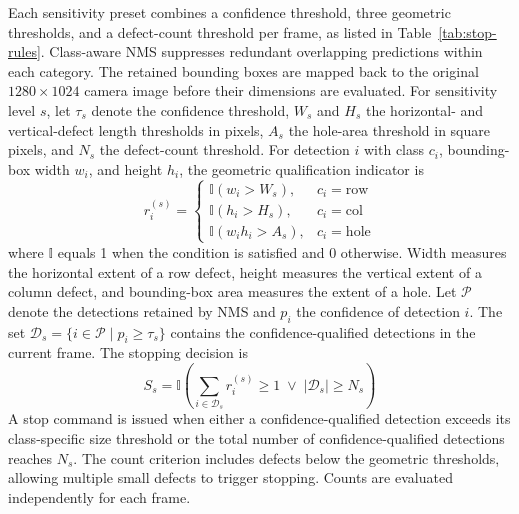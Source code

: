 \documentclass[journal]{IEEEtranTIE}
\begin{document}
Each sensitivity preset combines a confidence threshold, three geometric thresholds, and a defect-count threshold per frame, as listed in Table~\ref{tab:stop-rules}. Class-aware NMS suppresses redundant overlapping predictions within each category. The retained bounding boxes are mapped back to the original $1280\times1024$ camera image before their dimensions are evaluated. For sensitivity level $s$, let $\tau_s$ denote the confidence threshold, $W_s$ and $H_s$ the horizontal- and vertical-defect length thresholds in pixels, $A_s$ the hole-area threshold in square pixels, and $N_s$ the defect-count threshold. For detection $i$ with class $c_i$, bounding-box width $w_i$, and height $h_i$, the geometric qualification indicator is
\begin{equation}
r_i^{(s)}=
\begin{cases}
\mathbb{I}(w_i>W_s), & c_i=\mathrm{row}\\
\mathbb{I}(h_i>H_s), & c_i=\mathrm{col}\\
\mathbb{I}(w_i h_i>A_s), & c_i=\mathrm{hole}
\end{cases}
\label{eq:stop-rule}
\end{equation}
\noindent where $\mathbb{I}$ equals 1 when the condition is satisfied and 0 otherwise. Width measures the horizontal extent of a row defect, height measures the vertical extent of a column defect, and bounding-box area measures the extent of a hole. Let $\mathcal{P}$ denote the detections retained by NMS and $p_i$ the confidence of detection $i$. The set $\mathcal{D}_s=\{i\in\mathcal{P}\mid p_i\geq\tau_s\}$ contains the confidence-qualified detections in the current frame. The stopping decision is
\begin{equation}
S_s=\mathbb{I}\!\left(\sum_{i\in\mathcal{D}_s}r_i^{(s)}\geq1\;\lor\;|\mathcal{D}_s|\geq N_s\right)
\label{eq:frame-stop-rule}
\end{equation}
\noindent A stop command is issued when either a confidence-qualified detection exceeds its class-specific size threshold or the total number of confidence-qualified detections reaches $N_s$. The count criterion includes defects below the geometric thresholds, allowing multiple small defects to trigger stopping. Counts are evaluated independently for each frame.
\end{document}
